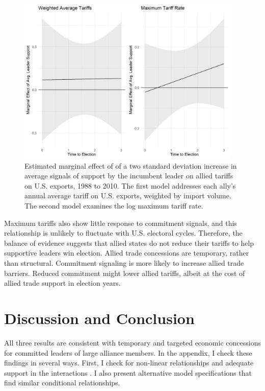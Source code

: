\documentclass[12pt]{article}
\begin{document}
\begin{figure}[htpb]
	\centering
		\includegraphics[width=0.95\textwidth]{../figures/tariff-me.png}
	\caption{Estimated marginal effect of of a two standard deviation increase in average signals of support by the incumbent leader on allied tariffs on U.S. exports, 1988 to 2010. The first model addresses each ally's annual average tariff on U.S. exports, weighted by import volume. The second model examines the log maximum tariff rate.}
	\label{fig:tariff-me}
\end{figure}


Maximum tariffs also show little response to commitment signals, and this relationship is unlikely to fluctuate with U.S. electoral cycles.
Therefore, the balance of evidence suggests that allied states do not reduce their tariffs to help supportive leaders win election.
Allied trade concessions are temporary, rather than structural.
Commitment signaling is more likely to increase allied trade barriers.
Reduced commitment might lower allied tariffs, albeit at the cost of allied trade support in election years.


\section{Discussion and Conclusion}


All three results are consistent with temporary and targeted economic concessions for committed leaders of large alliance members. 
In the appendix, I check these findings in several ways.
First, I check for non-linear relationships and adequate support in the interactions \citep{Hainmuelleretal2019}. 
I also present alternative model specifications that find similar conditional relationships.
\end{document}
